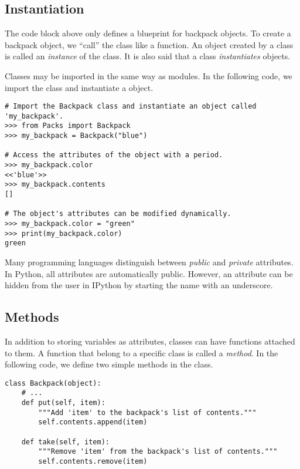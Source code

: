 \subsection*{Instantiation}

The  code block above only defines a blueprint for backpack objects.
To create a backpack object, we ``call'' the class like a function.
An object created by a class is called an \emph{instance} of the class.
It is also said that a class \emph{instantiates} objects.

Classes may be imported in the same way as modules.
In the following code, we import the  class and instantiate a  object.

\begin{lstlisting}
# Import the Backpack class and instantiate an object called 'my_backpack'.
>>> from Packs import Backpack
>>> my_backpack = Backpack("blue")

# Access the attributes of the object with a period.
>>> my_backpack.color
<<'blue'>>
>>> my_backpack.contents
[]

# The object's attributes can be modified dynamically.
>>> my_backpack.color = "green"
>>> print(my_backpack.color)
green
\end{lstlisting}

\begin{info}
Many programming languages distinguish between \emph{public} and \emph{private} attributes.
In Python, all attributes are automatically public.
However, an attribute can be hidden from the user in IPython by starting the name with an underscore. %
\end{info}

\subsection*{Methods}

In addition to storing variables as attributes, classes can have functions attached to them.
A function that belong to a specific class is called a \emph{method}.
In the following code, we define two simple methods in the  class.

\begin{lstlisting}
class Backpack(object):
    # ...
    def put(self, item):
        """Add 'item' to the backpack's list of contents."""
        self.contents.append(item)
    
    def take(self, item):
        """Remove 'item' from the backpack's list of contents."""
        self.contents.remove(item)
\end{lstlisting}

